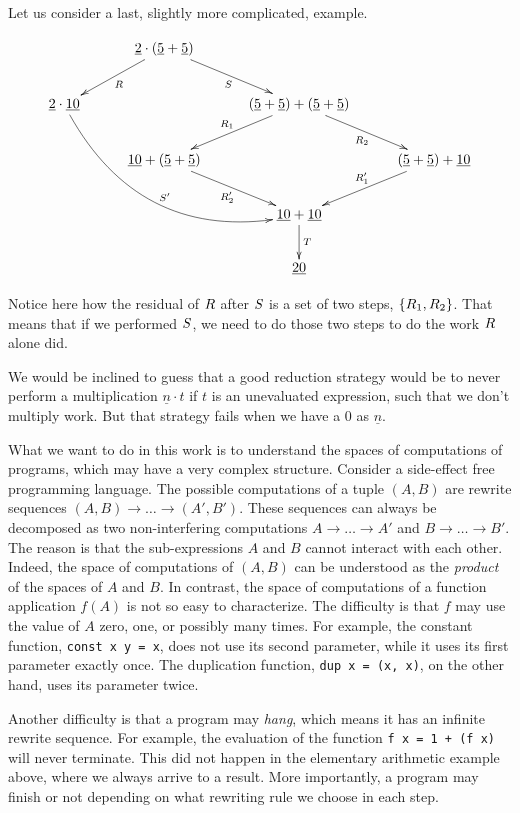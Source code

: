 Let us consider a last, slightly more complicated, example.

\[
\xymatrix@C=1cm{
  & \underline{2} \cdot (\underline{5} + \underline{5}) \ar[dl]^{\redex} \ar[dr]_{\redextwo} & & \\
\underline{2} \cdot \underline{10} \ar@/_3pc/[ddrr]^{\redextwo'} & & (\underline{5} + \underline{5}) + (\underline{5} + \underline{5}) \ar[dl]_{\redex_1} \ar[dr]_{\redex_2}& \\
  & \underline{10} + (\underline{5} + \underline{5}) \ar[dr]_{\redex_2'} & & (\underline{5} + \underline{5}) + \underline{10} \ar[dl]_{\redex_1'} \\
  & & \underline{10} + \underline{10} \ar[d]^{\redexthree}& \\
  & & \underline{20} &
}
\]

\noindent
Notice here how the residual of $R$ after $S$ is a set of two steps, $\{R_1, R_2\}$.
That means that if we performed $S$, we need to do those two steps to do the work $R$ alone did.

We would be inclined to guess that a good reduction strategy would be to never perform a
multiplication $\underline{n} \cdot t$ if $t$ is an unevaluated expression,
such that we don't multiply work. But that strategy fails when we have a 0 as $\underline{n}$.

\bigskip


What we want to do in this work is to understand the spaces of computations of programs,
which may have a very complex structure.
Consider a side-effect free programming language.
The possible computations of a tuple $(A,B)$
are rewrite sequences $(A,B) \to \hdots \to (A',B')$.
These sequences can always be decomposed as two non-interfering computations
$A \to \hdots \to A'$ and $B \to \hdots \to B'$.
The reason is that the sub-expressions $A$ and $B$ cannot interact with each other.
Indeed, the space of computations of $(A,B)$ can be understood as
the {\em product} of the spaces of $A$ and $B$.
In contrast, the space of computations of a function application $f(A)$ is not so easy
to characterize. The difficulty is that $f$ may use the value of $A$ zero, one, or
possibly many times.
For example, the constant function, \texttt{const x y = x}, does not use its second parameter,
while it uses its first parameter exactly once. The duplication function,
\texttt{dup x = (x, x)}, on the other hand, uses
its parameter twice.

Another difficulty is that a program may \emph{hang}, which means it has an infinite rewrite
sequence. For example, the evaluation of the function \texttt{f x = 1 + (f x)}
will never terminate.
This did not happen in the elementary arithmetic example above, where we always arrive to a result.
More importantly, a program may finish or not depending on what rewriting rule we choose in each step.

